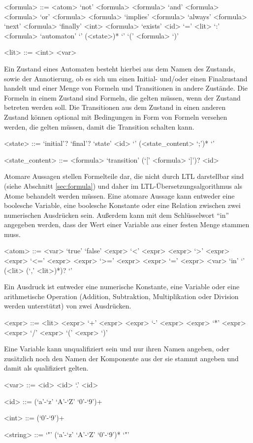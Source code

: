 \begin{grammar}
  <formula> ::= <atom>
  \alt `not' <formula>
  \alt <formula> `and' <formula>
  \alt <formula> `or' <formula>
  \alt <formula> `implies' <formula>
  \alt `always' <formula>
  \alt `next' <formula>
  \alt `finally' <int> <formula>
  \alt `exists' <id> `=' <lit> `:' <formula>
  \alt `automaton' `{' (<state>)* `}'
  \alt `(' <formula> `)'
  
  <lit> ::= <int>
  \alt <var>
\end{grammar}
Ein Zustand eines Automaten besteht hierbei aus dem Namen des Zustands, sowie der Annotierung, ob es sich um einen Initial- und/oder einen Finalzustand handelt und einer Menge von Formeln und Transitionen in andere Zustände.
Die Formeln in einem Zustand sind Formeln, die gelten müssen, wenn der Zustand betreten werden soll.
Die Transitionen aus dem Zustand in einen anderen Zustand können optional mit Bedingungen in Form von Formeln versehen werden, die gelten müssen, damit die Transition schalten kann.
\begin{grammar}
  <state> ::= `initial'? `final'? `state' <id> `{' (<state\_content> `;')* `}'

  <state\_content> ::= <formula>
  \alt `transition' (`[' <formula> `]')? <id>
\end{grammar}
Atomare Aussagen stellen Formelteile dar, die nicht durch LTL darstellbar sind (siehe Abschnitt \ref{sec:formula}) und daher im LTL-Übersetzungsalgorithmus als Atome behandelt werden müssen.
Eine atomare Aussage kann entweder eine boolesche Variable, eine boolesche Konstante oder eine Relation zwischen zwei numerischen Ausdrücken sein.
Außerdem kann mit dem Schlüsselwort "`in"' angegeben werden, dass der Wert einer Variable aus einer festen Menge stammen muss.
\begin{grammar}
  <atom> ::= <var>
  \alt `true'
  \alt `false'
  \alt <expr> `<' <expr>
  \alt <expr> `>' <expr>
  \alt <expr> `<=' <expr>
  \alt <expr> `>=' <expr>
  \alt <expr> `=' <expr>
  \alt <var> `in' `{' (<lit> (`,' <lit>)*)? `}'
\end{grammar}
Ein Ausdruck ist entweder eine numerische Konstante, eine Variable oder eine arithmetische Operation (Addition, Subtraktion, Multiplikation oder Division werden unterstützt) von zwei Ausdrücken.
\begin{grammar}
  <expr> ::= <lit>
  \alt <expr> `+' <expr>
  \alt <expr> `-' <expr>
  \alt <expr> `*' <expr>
  \alt <expr> `/' <expr>
  \alt `(' <expr> `)'
\end{grammar}
Eine Variable kann unqualifiziert sein und nur ihren Namen angeben, oder zusätzlich noch den Namen der Komponente aus der sie stammt angeben und damit als qualifiziert gelten.
\begin{grammar}  
  <var> ::= <id>
  \alt <id> `.' <id>
  
  <id> ::= (`a'-`z' `A'-`Z' `0'-`9')+
  
  <int> ::= (`0'-`9')+

  <string> ::= `"' (`a'-`z' `A'-`Z' `0'-`9')* `"'
\end{grammar}
